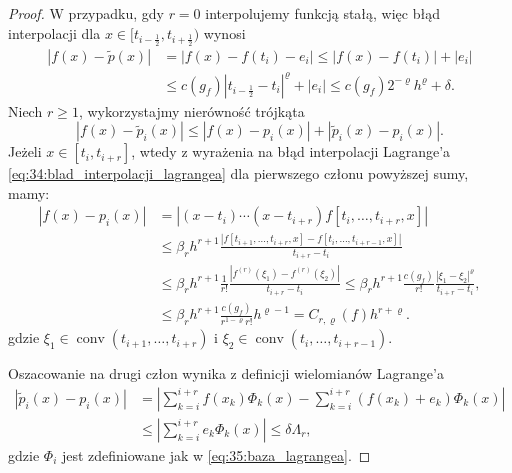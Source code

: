 \documentclass[oik, pdftex, man]{mgrwms}
\DeclareMathOperator*{\conv}{conv}
\begin{document}
    \begin{proof}
        W przypadku, gdy $r=0$ interpolujemy funkcją stałą, więc błąd interpolacji dla $x \in [t_{i - \frac{1}{2}}, t_{i + \frac{1}{2}})$ wynosi
        \begin{equation*}
            \begin{aligned}                
                |f(x) - \tilde{p}(x)| &= |f(x) - f(t_{i}) - e_{i}| \leq |f(x) - f(t_{i})| + |e_{i}| \\
                    &\leq c(g_{f}) \left|t_{i-\frac{1}{2}} - t_{i}\right|^{\varrho} + |e_{i}| \leq c(g_{f}) 2^{-\varrho}h^{\varrho} + \delta.
            \end{aligned}
        \end{equation*}
        Niech $r \geq 1$, wykorzystajmy nierówność trójkąta
        \begin{equation*}
            \left|f(x)-\tilde{p}_{i}(x)\right| \leq\left|f(x)-p_{i}(x)\right|+\left|\tilde{p}_{i}(x)-p_{i}(x)\right|.
        \end{equation*}
        Jeżeli $x \in\left[t_{i}, t_{i+r}\right]$, wtedy z wyrażenia na błąd interpolacji Lagrange'a \eqref{eq:34:blad_interpolacji_lagrangea} dla pierwszego członu powyższej sumy, mamy:
        \begin{equation} \label{eq:36}
            \begin{aligned}
                \left|f(x)-p_{i}(x)\right| &=\left|\left(x-t_{i}\right) \cdots\left(x-t_{i+r}\right) f\left[t_{i}, \ldots, t_{i+r}, x\right]\right| \\
                & \leq \beta_{r} h^{r+1} \frac{\left|f\left[t_{i+1}, \ldots, t_{i+r}, x\right]-f\left[t_{i}, \ldots, t_{i+r-1}, x\right]\right|}{t_{i+r}-t_{i}} \\
                & \leq \beta_{r} h^{r+1} \frac{1}{r!} \frac{\left|f^{(r)}(\xi_{1})-f^{(r)}(\xi_{2})\right|}{t_{i+r}-t_{i}} 
                    \leq \beta_{r} h^{r+1} \frac{c(g_{f})}{r!} \frac{\left|\xi_{1}-\xi_{2}\right|^{\varrho}}{t_{i+r}-t_{i}}, \\
                & \leq \beta_{r} h^{r+1} \frac{c\left(g_{f}\right)}{r^{1-\varrho} r !} h^{\varrho-1}=C_{r, \varrho}(f) h^{r+\varrho}.
            \end{aligned}
        \end{equation}
        gdzie $\xi_{1} \in \conv(t_{i+1}, \ldots, t_{i+r})$ i $\xi_{2} \in \conv(t_{i}, \ldots, t_{i+r-1})$.

        Oszacowanie na drugi człon wynika z definicji wielomianów Lagrange'a
        \begin{equation} \label{eq:1}
            \begin{aligned}
                \left|\tilde{p}_{i}(x)-p_{i}(x)\right| &=\left|\sum_{k=i}^{i+r} f(x_{k}) \Phi_{k}(x) - \sum_{k=i}^{i+r} (f(x_{k}) + e_{k}) \Phi_{k}(x)\right| \\
                    & \leq \left|\sum_{k=i}^{i+r} e_{k} \Phi_{k}(x)\right| \leq \delta \Lambda_{r},
            \end{aligned}
        \end{equation}
        gdzie $\Phi_{i}$ jest zdefiniowane jak w \eqref{eq:35:baza_lagrangea}.


\end{proof}
\end{document}

